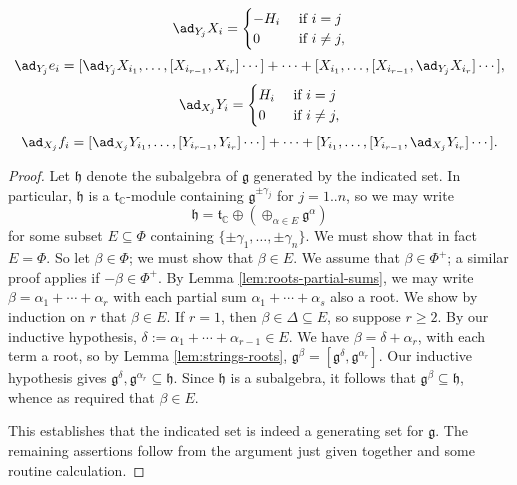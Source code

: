 \documentclass[reqno]{amsart} 
\begin{document}
\begin{corollary}
  \begin{equation*}
    \ad_{Y_j} X_i
    =
    \begin{cases}
      - H_i & \text{ if }i = j \\
      0 & \text{ if } i \neq j,
    \end{cases}
  \end{equation*}
  \begin{equation*}
    \ad_{Y_j} e_i
    =
    [\ad_{Y_j} X_{i_1},\dotsc,[X_{i_{r-1}}, X_{i_r}]\dotsb]
    + \dotsb
    +
    [ X_{i_1},\dotsc,[X_{i_{r-1}}, \ad_{Y_j} X_{i_r}]\dotsb],
  \end{equation*}
  \begin{equation*}
    \ad_{X_j} Y_i
    =
    \begin{cases}
      H_i & \text{ if }i = j \\
      0 & \text{ if } i \neq j,
    \end{cases}
  \end{equation*}
  \begin{equation*}
    \ad_{X_j} f_i
    =
    [\ad_{X_j} Y_{i_1},\dotsc,[Y_{i_{r-1}}, Y_{i_r}]\dotsb]
    + \dotsb
    +
    [ Y_{i_1},\dotsc,[Y_{i_{r-1}}, \ad_{X_j} Y_{i_r}]\dotsb].
  \end{equation*}
\end{corollary}
\begin{proof}
  Let $\mathfrak{h}$ denote the subalgebra of $\mathfrak{g}$ generated by the indicated set.  In particular, $\mathfrak{h}$ is a $\mathfrak{t}_{\mathbb{C}}$-module containing $\mathfrak{g}^{\pm \gamma_j}$ for $j=1..n$, so we may write
  \begin{equation*}
    \mathfrak{h} = \mathfrak{t}_{\mathbb{C}} \oplus (\oplus_{\alpha \in E} \mathfrak{g}^{\alpha})
  \end{equation*}
  for some subset $E \subseteq \Phi$ containing $\{\pm \gamma_1, \dotsc, \pm \gamma_n\}$.  We must show that in fact $E = \Phi$.  So let $\beta \in \Phi$; we must show that $\beta \in E$.  We assume that $\beta \in \Phi^+$; a similar proof applies if $- \beta \in \Phi^+$.  By Lemma \ref{lem:roots-partial-sums}, we may write $\beta = \alpha_1 + \dotsb + \alpha_r$ with each partial sum $\alpha_1 + \dotsb + \alpha_s$ also a root.  We show by induction on $r$ that $\beta \in E$.  If $r = 1$, then $\beta \in \Delta \subseteq E$, so suppose $r \geq 2$.  By our inductive hypothesis, $\delta := \alpha_1 + \dotsb + \alpha_{r-1} \in E$.  We have $\beta = \delta + \alpha_r$, with each term a root, so by Lemma \ref{lem:strings-roots}, $\mathfrak{g}^{\beta} = [\mathfrak{g}^\delta, \mathfrak{g}^{\alpha_r}]$.  Our inductive hypothesis gives $\mathfrak{g}^\delta, \mathfrak{g}^{\alpha_r} \subseteq \mathfrak{h}$.  Since $\mathfrak{h}$ is a subalgebra, it follows that $\mathfrak{g}^{\beta} \subseteq \mathfrak{h}$, whence as required that $\beta \in E$.

  This establishes that the indicated set is indeed a generating set for $\mathfrak{g}$.  The remaining assertions follow from the argument just given together and some routine calculation.
\end{proof}
\end{document}
